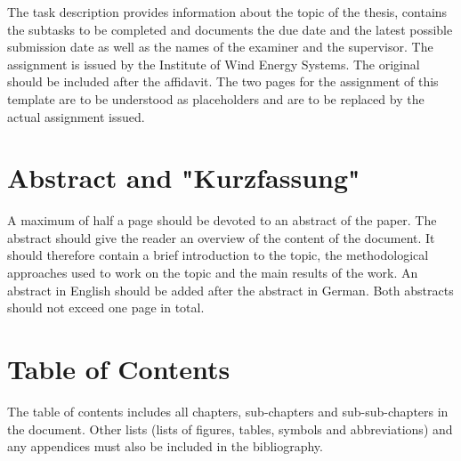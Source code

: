 The task description provides information about the topic of the thesis, contains the subtasks to be completed and documents the due date and the latest possible submission date as well as the names of the examiner and the supervisor. The assignment is issued by the Institute of Wind Energy Systems. The original should be included after the affidavit. The two pages for the assignment of this template are to be understood as placeholders and are to be replaced by the actual assignment issued. 

%
%


\section{Abstract and "Kurzfassung"}
\label{sec:Abstract_EN}

A maximum of half a page should be devoted to an abstract of the paper. The abstract should give the reader an overview of the content of the document. It should therefore contain a brief introduction to the topic, the methodological approaches used to work on the topic and the main results of the work. An abstract in English should be added after the abstract in German. Both abstracts should not exceed one page in total.

\section{Table of Contents}
\label{sec:TableOfContents}

The table of contents includes all chapters, sub-chapters and sub-sub-chapters in the document. Other lists (lists of figures, tables, symbols and abbreviations) and any appendices must also be included in the bibliography. 

